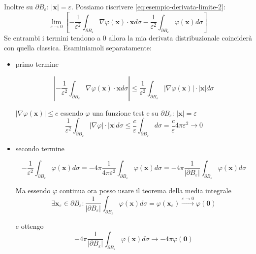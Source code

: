 \documentclass[10pt,a4paper,twoside,openright]{book}
\begin{document}
Inoltre su $\displaystyle \partial B_{\varepsilon }$: $\displaystyle | \mathbf{x}| =\varepsilon $. Possiamo riscrivere \eqref{eq:esempio-derivata-limite-2}:
\begin{equation*}
	\lim _{\varepsilon \rightarrow 0}\left[ -\frac{1}{\varepsilon ^{2}}\int _{\partial B_{\varepsilon }} \nabla \varphi (\mathbf{x}) \cdotp \mathbf{x} d\sigma -\frac{1}{\varepsilon ^{2}}\int _{\partial B_{\varepsilon }} \varphi (\mathbf{x}) d\sigma \right]
\end{equation*}
Se entrambi i termini tendono a $0$ allora la mia derivata distribuzionale coinciderà con quella classica. Esaminiamoli separatamente:
\begin{itemize}
	\item primo termine
	      
	      \begin{equation*}
	      	\left| -\frac{1}{\varepsilon ^{2}}\int _{\partial B_{\varepsilon }} \nabla \varphi (\mathbf{x}) \cdotp \mathbf{x} d\sigma \right| \leqslant \frac{1}{\varepsilon ^{2}}\int _{\partial B_{\varepsilon }}| \nabla \varphi (\mathbf{x})| \cdotp | \mathbf{x}| d\sigma 
	      \end{equation*}
	      
	      $\displaystyle | \nabla \varphi (\mathbf{x})| \leqslant c$ essendo $\displaystyle \varphi $ una funzione test e su $\displaystyle \partial B_{\varepsilon }$: $\displaystyle | \mathbf{x}| =\varepsilon $
	      \begin{equation*}
	      	\frac{1}{\varepsilon ^{2}}\int _{\partial B_{\varepsilon }}| \nabla \varphi | \cdotp | \mathbf{x}| d\sigma \leqslant \frac{c}{\varepsilon }\int _{\partial B_{\varepsilon }} d\sigma =\frac{c}{\varepsilon } 4\pi \varepsilon ^{2}\rightarrow 0
	      \end{equation*}
	\item secondo termine
	      
	      \begin{equation*}
	      	-\frac{1}{\varepsilon ^{2}}\int _{\partial B_{\varepsilon }} \varphi (\mathbf{x}) d\sigma =-4\pi \frac{1}{4\pi \varepsilon ^{2}}\int _{\partial B_{\varepsilon }} \varphi (\mathbf{x}) d\sigma =-4\pi \frac{1}{| \partial B_{\varepsilon }| }\int _{\partial B_{\varepsilon }} \varphi (\mathbf{x}) d\sigma 
	      \end{equation*}
	      
	      Ma essendo $\displaystyle \varphi $ continua ora posso usare il teorema della media integrale\begin{equation*}
	      \exists \mathbf{x}_{\varepsilon } \in \partial B_{\varepsilon } :\frac{1}{| \partial B_{\varepsilon }| }\int _{\partial B_{\varepsilon }} \varphi (\mathbf{x}) d\sigma =\varphi (\mathbf{x}_{\varepsilon })\xrightarrow{\varepsilon \rightarrow 0} \varphi (\mathbf{0})
	\end{equation*}
	
	e ottengo\begin{equation*}
	-4\pi \frac{1}{| \partial B_{\varepsilon }| }\int _{\partial B_{\varepsilon }} \varphi (\mathbf{x}) d\sigma \rightarrow -4\pi \varphi (\mathbf{0})
	\end{equation*}
\end{itemize}
\end{document}
